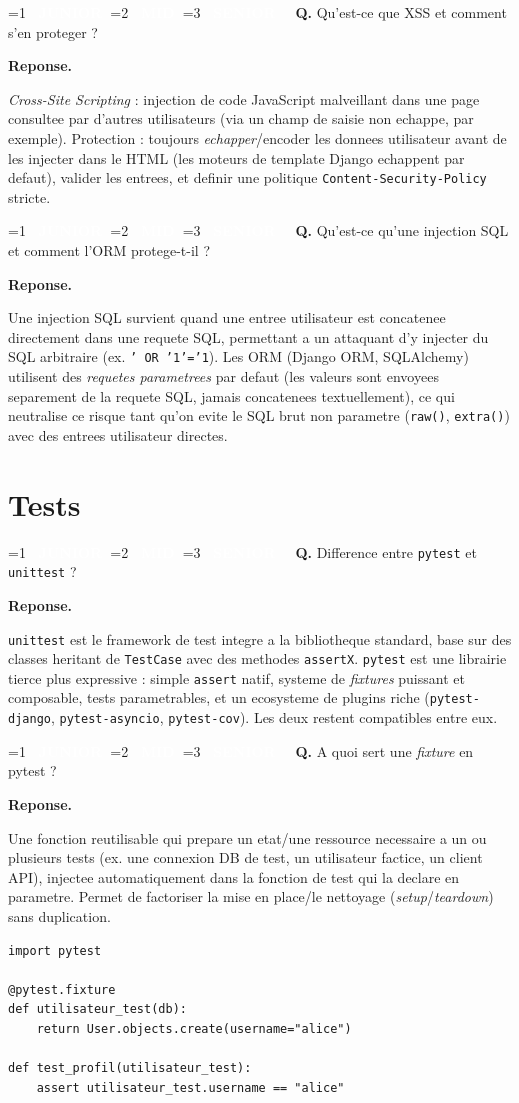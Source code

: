 \documentclass[11pt,a4paper]{article}
\newcommand{\badgeJ}{\textcolor{white}{\colorbox{junior}{\small\bfseries\ JUNIOR\ }}}
\newcommand{\badgeM}{\textcolor{white}{\colorbox{mid}{\small\bfseries\ MID\ }}}
\newcommand{\badgeS}{\textcolor{white}{\colorbox{senior}{\small\bfseries\ SENIOR\ }}}
\newcounter{qcount}
\newenvironment{qa}[2]{%
  \stepcounter{qcount}%
  \par\vspace{6pt}%
  \noindent\colorbox{qbg}{\parbox{\dimexpr\linewidth-12pt}{\vspace{2pt}%
  \ifnum#1=1 \badgeJ\fi\ifnum#1=2 \badgeM\fi\ifnum#1=3 \badgeS\fi
  \ \textbf{Q\theqcount.} #2\vspace{2pt}}}\par\vspace{4pt}%
  \noindent\textbf{\color{accent}Reponse.}\ \ignorespaces
}{%
  \par\vspace{8pt}%
}
\begin{document}
\begin{qa}{2}{Qu'est-ce que XSS et comment s'en proteger ?}
\emph{Cross-Site Scripting} : injection de code JavaScript malveillant dans
une page consultee par d'autres utilisateurs (via un champ de saisie non
echappe, par exemple). Protection : toujours \emph{echapper}/encoder les
donnees utilisateur avant de les injecter dans le HTML (les moteurs de
template Django echappent par defaut), valider les entrees, et definir une
politique \texttt{Content-Security-Policy} stricte.
\end{qa}

\begin{qa}{1}{Qu'est-ce qu'une injection SQL et comment l'ORM protege-t-il ?}
Une injection SQL survient quand une entree utilisateur est concatenee
directement dans une requete SQL, permettant a un attaquant d'y injecter du
SQL arbitraire (ex. \texttt{' OR '1'='1}). Les ORM (Django ORM, SQLAlchemy)
utilisent des \emph{requetes parametrees} par defaut (les valeurs sont
envoyees separement de la requete SQL, jamais concatenees textuellement), ce
qui neutralise ce risque tant qu'on evite le SQL brut non parametre
(\texttt{raw()}, \texttt{extra()}) avec des entrees utilisateur directes.
\end{qa}

\newpage
\section{Tests}

\begin{qa}{1}{Difference entre \texttt{pytest} et \texttt{unittest} ?}
\texttt{unittest} est le framework de test integre a la bibliotheque standard,
base sur des classes heritant de \texttt{TestCase} avec des methodes
\texttt{assertX}. \texttt{pytest} est une librairie tierce plus expressive :
simple \texttt{assert} natif, systeme de \emph{fixtures} puissant et
composable, tests parametrables, et un ecosysteme de plugins riche
(\texttt{pytest-django}, \texttt{pytest-asyncio}, \texttt{pytest-cov}). Les
deux restent compatibles entre eux.
\end{qa}

\begin{qa}{2}{A quoi sert une \emph{fixture} en pytest ?}
Une fonction reutilisable qui prepare un etat/une ressource necessaire a un
ou plusieurs tests (ex. une connexion DB de test, un utilisateur factice,
un client API), injectee automatiquement dans la fonction de test qui la
declare en parametre. Permet de factoriser la mise en place/le nettoyage
(\emph{setup}/\emph{teardown}) sans duplication.
\begin{lstlisting}
import pytest

@pytest.fixture
def utilisateur_test(db):
    return User.objects.create(username="alice")

def test_profil(utilisateur_test):
    assert utilisateur_test.username == "alice"
\end{lstlisting}
\end{qa}
\end{document}
